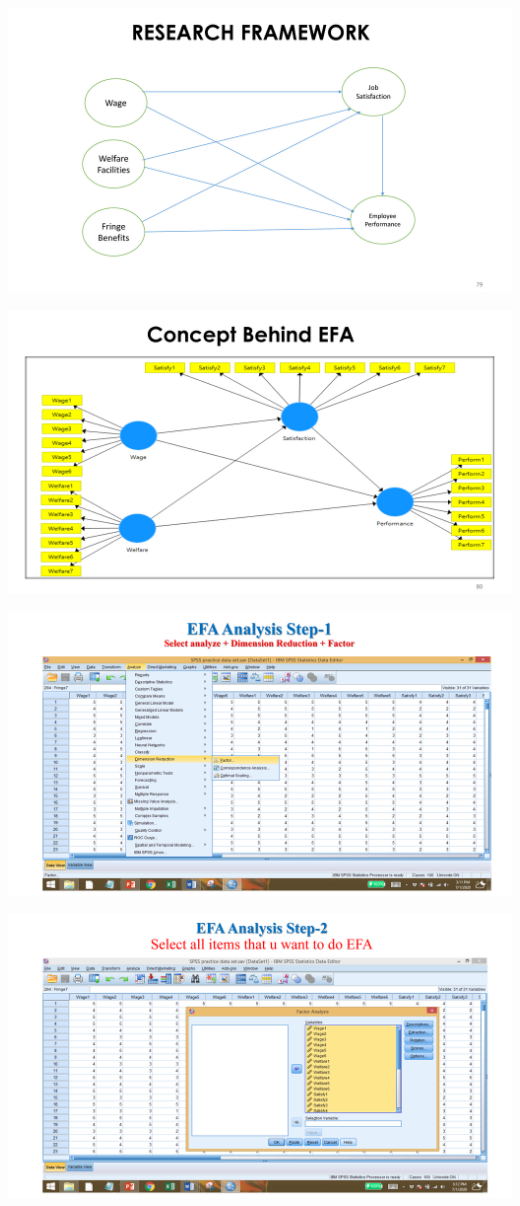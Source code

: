 \documentclass[
  letterpaper,
  DIV=11,
  numbers=noendperiod]{scrreprt}
\begin{document}
\includegraphics{images/slides/img_Page_068.png}

\includegraphics{images/slides/img_Page_069.png}

\includegraphics{images/slides/img_Page_070.png}

\includegraphics{images/slides/img_Page_071.png}
\end{document}
